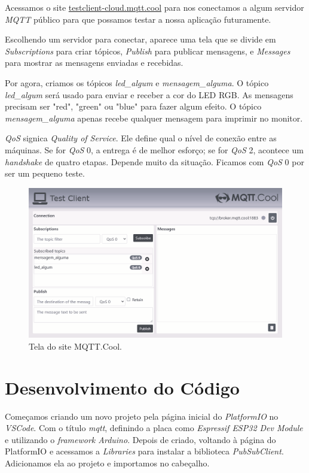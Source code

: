 \documentclass[12pt]{article}
\begin{document}
Acessamos o site \href{https://testclient-cloud.mqtt.cool/}{testclient-cloud.mqtt.cool} para nos conectamos a algum servidor \textit{MQTT} público para que possamos testar a nossa aplicação futuramente.

Escolhendo um servidor para conectar, aparece uma tela que se divide em \textit{Subscriptions} para criar tópicos, \textit{Publish} para publicar mensagens, e \textit{Messages} para mostrar as mensagens enviadas e recebidas.

Por agora, criamos os tópicos \textit{led\_algum} e \textit{mensagem\_alguma}. O tópico \textit{led\_algum} será usado para enviar e receber a cor do LED RGB. As mensagens precisam ser "red", "green" ou "blue" para fazer algum efeito. O tópico \textit{mensagem\_alguma} apenas recebe qualquer mensagem para imprimir no monitor.

\textit{QoS} signica \textit{Quality of Service}. Ele define qual o nível de conexão entre as máquinas. Se for \textit{QoS} 0, a entrega é de melhor esforço; se for \textit{QoS} 2, acontece um \textit{handshake} de quatro etapas. Depende muito da situação. Ficamos com \textit{QoS} 0 por ser um pequeno teste.

\begin{figure}[H]
    \centering
    \includegraphics[width=0.5\linewidth]{img/Captura de tela 2024-11-26 231054.png}
    \caption{Tela do site MQTT.Cool.}
    \label{fig:mqtt-cool}
\end{figure}

\section{Desenvolvimento do Código}

Começamos criando um novo projeto pela página inicial do \textit{PlatformIO} no \textit{VSCode}. Com o título \textit{mqtt}, definindo a placa como \textit{Espressif ESP32 Dev Module} e utilizando o \textit{framework Arduino}. Depois de criado, voltando à página do PlatformIO e acessamos a \textit{Libraries} para instalar a biblioteca \textit{PubSubClient}. Adicionamos ela ao projeto e importamos no cabeçalho.
\end{document}
